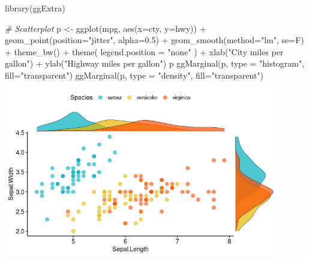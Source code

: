 \documentclass[
]{book}
\newenvironment{Shaded}{\begin{snugshade}}{\end{snugshade}}
\newcommand{\AttributeTok}[1]{\textcolor[rgb]{0.77,0.63,0.00}{#1}}
\newcommand{\CommentTok}[1]{\textcolor[rgb]{0.56,0.35,0.01}{\textit{#1}}}
\newcommand{\FloatTok}[1]{\textcolor[rgb]{0.00,0.00,0.81}{#1}}
\newcommand{\FunctionTok}[1]{\textcolor[rgb]{0.00,0.00,0.00}{#1}}
\newcommand{\NormalTok}[1]{#1}
\newcommand{\OtherTok}[1]{\textcolor[rgb]{0.56,0.35,0.01}{#1}}
\newcommand{\SpecialCharTok}[1]{\textcolor[rgb]{0.00,0.00,0.00}{#1}}
\newcommand{\StringTok}[1]{\textcolor[rgb]{0.31,0.60,0.02}{#1}}
\begin{document}
\begin{Shaded}
\begin{Highlighting}[]
\FunctionTok{library}\NormalTok{(ggExtra)}

\CommentTok{\# Scatterplot}
\NormalTok{p }\OtherTok{\textless{}{-}} \FunctionTok{ggplot}\NormalTok{(mpg, }\FunctionTok{aes}\NormalTok{(}\AttributeTok{x=}\NormalTok{cty, }\AttributeTok{y=}\NormalTok{hwy)) }\SpecialCharTok{+} 
  \FunctionTok{geom\_point}\NormalTok{(}\AttributeTok{position=}\StringTok{"jitter"}\NormalTok{, }\AttributeTok{alpha=}\FloatTok{0.5}\NormalTok{) }\SpecialCharTok{+}
  \FunctionTok{geom\_smooth}\NormalTok{(}\AttributeTok{method=}\StringTok{"lm"}\NormalTok{, }\AttributeTok{se=}\NormalTok{F) }\SpecialCharTok{+}
  \FunctionTok{theme\_bw}\NormalTok{() }\SpecialCharTok{+}
  \FunctionTok{theme}\NormalTok{(}
    \AttributeTok{legend.position =} \StringTok{"none"}
\NormalTok{  ) }\SpecialCharTok{+}
  \FunctionTok{xlab}\NormalTok{(}\StringTok{"City miles per gallon"}\NormalTok{) }\SpecialCharTok{+}
  \FunctionTok{ylab}\NormalTok{(}\StringTok{"Highway miles per gallon"}\NormalTok{)}
\NormalTok{p}
\FunctionTok{ggMarginal}\NormalTok{(p, }\AttributeTok{type =} \StringTok{"histogram"}\NormalTok{, }\AttributeTok{fill=}\StringTok{"transparent"}\NormalTok{) }
\FunctionTok{ggMarginal}\NormalTok{(p, }\AttributeTok{type =} \StringTok{"density"}\NormalTok{, }\AttributeTok{fill=}\StringTok{"transparent"}\NormalTok{)}
\end{Highlighting}
\end{Shaded}

\includegraphics[width=4.6875in,height=\textheight]{images/10/000005.png}
\end{document}
